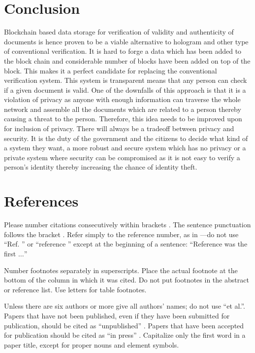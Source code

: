 \documentclass[conference]{IEEEtran}
\begin{document}
\section{Conclusion}
Blockchain based data storage for verification of validity and authenticity of documents is hence proven to be a viable alternative to hologram and other type of conventional verification. It is hard to forge a data which has been added to the block chain and considerable number of blocks have been added on top of the block. This makes it a perfect candidate for replacing the conventional verification system. This system is transparent means that any person can check if a given document is valid. One of the downfalls of this approach is that it is a violation of privacy as anyone with enough information can traverse the whole network and assemble all the documents which are related to a person thereby causing a threat to the person. Therefore, this idea needs to be improved upon for inclusion of privacy. There will always be a tradeoff between privacy and security. It is the duty of the government and the citizens to decide what kind of a system they want, a more robust and secure system which has no privacy or a private system where security can be compromised as it is not easy to verify a person’s identity thereby increasing the chance of identity theft. 

\section*{References}

Please number citations consecutively within brackets \cite{b1}. The 
sentence punctuation follows the bracket \cite{b2}. Refer simply to the reference 
number, as in \cite{b3}---do not use ``Ref. \cite{b3}'' or ``reference \cite{b3}'' except at 
the beginning of a sentence: ``Reference \cite{b3} was the first $\ldots$''

Number footnotes separately in superscripts. Place the actual footnote at 
the bottom of the column in which it was cited. Do not put footnotes in the 
abstract or reference list. Use letters for table footnotes.

Unless there are six authors or more give all authors' names; do not use 
``et al.''. Papers that have not been published, even if they have been 
submitted for publication, should be cited as ``unpublished'' \cite{b4}. Papers 
that have been accepted for publication should be cited as ``in press'' \cite{b5}. 
Capitalize only the first word in a paper title, except for proper nouns and 
element symbols.
\end{document}
